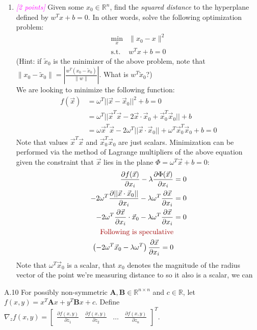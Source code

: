 \documentclass{article}
\newcommand{\field}[1]{\mathbb{#1}}
\newcommand{\1}{\mathbf{1}}
\newcommand{\R}{\field{R}} %
\newcommand{\mat}[1]{\boldsymbol{#1}} %
\newcommand{\points}[1]{\small\textcolor{magenta}{\emph{[#1 points]}} \normalsize}
\begin{document}
\begin{enumerate}
	\item \points{2} Given some $x_0 \in \R^n$, find the \emph{squared distance} to the hyperplane defined by $w^T x + b=0$. In other words, solve the following optimization problem:
	\begin{align*}
	\min_x& \|x_0 - x \|^2\\
	\text{s.t. }&w^Tx +b = 0
	\end{align*}
	(Hint: if $\widetilde{x}_0$ is the minimizer of the above problem, note that $\| x_0 - \widetilde{x}_0 \| = | \frac{w^T(x_0 - \widetilde{x}_0)}{\|w\|} |$. What is $w^T \widetilde{x}_0$?) \\
	    We are looking to minimize the following function: 
	    \begin{align*}
	        f(\vec x) &= \omega^T||\vec x-\vec x_0||^2 + b = 0 \\
	        &= \omega^T||\vec x^T \vec x - 2\vec x\cdot \vec x_0 + \vec x_0^T \vec x_0|| + b \\
	        &= \omega\vec x^T \vec x - 2\omega^T||\vec x\cdot \vec x_0|| + \omega^T\vec x_0^T \vec x_0 + b = 0
	    \end{align*} 
	    Note that values $\vec x^T \vec x$ and $\vec x_0^T \vec x_0$ are just scalars. Minimization can be performed via the method of Lagrange multipliers of the above equation given the constraint that $\vec x$ lies in the plane $\Phi = \omega^T\vec x +b =0$:
	    \begin{align*}
	        \frac{\partial f(\vec x)}{\partial x_i} - \lambda \frac{\partial \Phi(\vec x)}{\partial x_i} &= 0 \\
	        -2\omega^T\frac{\partial ||\vec x\cdot\vec x_0||}{\partial x_i} - \lambda\omega^T \frac{\partial \vec x}{\partial x_i} &= 0 \\
	        -2\omega^T\frac{\partial \vec x}{\partial x_i}\cdot\vec x_0 - \lambda\omega^T\frac{\partial \vec x}{\partial x_i} &= 0 \\
	        \text{\color{red} Following is speculative} \\
	        \left(-2\omega^T\vec x_0 - \lambda\omega^T\right)\frac{\partial \vec x}{\partial x_i} = 0 \\
	    \end{align*}
	    Note that $\omega^T\vec x_0$ is a scalar, that $x_0$ denotes the magnitude of the radius vector of the point we're measuring distance to so it also is a scalar, we can 
\end{enumerate}


\newpage
A.10 For possibly non-symmetric $\mat{A}, \mat{B} \in \R^{n \times n}$ and $c \in \R$, let $f(x, y) = x^T \mat{A} x + y^T \mat{B} x + c$. Define $\nabla_z f(x,y) = \begin{bmatrix} \frac{\partial f(x,y)}{\partial z_1} & \frac{\partial f(x,y)}{\partial z_2} & \dots & \frac{\partial f(x,y)}{\partial z_n} \end{bmatrix}^T$.  
\end{document}
